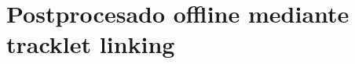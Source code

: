 \documentclass[../MAIN.tex]{subfiles}
\begin{document}
	
	
	\section{Postprocesado offline mediante tracklet linking}
	
	
\end{document}
